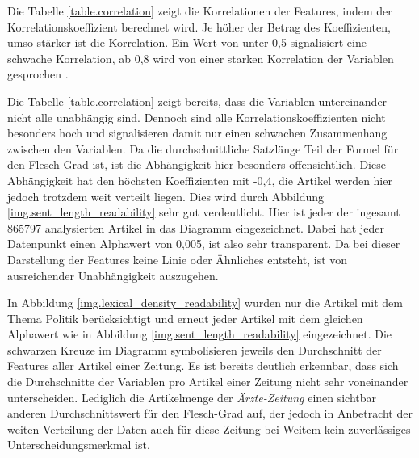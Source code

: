 Die Tabelle \ref{table.correlation} zeigt die Korrelationen der Features, indem der Korrelationskoeffizient berechnet wird. Je höher der Betrag des Koeffizienten, umso stärker ist die Korrelation. Ein Wert von unter 0,5 signalisiert eine schwache Korrelation, ab 0,8 wird von einer starken Korrelation der Variablen gesprochen \cite[S.~268-273]{burkschat2012beschreibende}.

Die Tabelle \ref{table.correlation} zeigt bereits, dass die Variablen untereinander nicht alle unabhängig sind. Dennoch sind alle Korrelationskoeffizienten nicht besonders hoch und signalisieren damit nur einen schwachen Zusammenhang zwischen den Variablen. Da die durchschnittliche Satzlänge Teil der Formel für den Flesch-Grad ist, ist die Abhängigkeit hier besonders offensichtlich. Diese Abhängigkeit hat den höchsten Koeffizienten mit -0,4, die Artikel werden hier jedoch trotzdem weit verteilt liegen. Dies wird durch Abbildung \ref{img.sent_length_readability} sehr gut verdeutlicht. Hier ist jeder der ingesamt 865797 analysierten Artikel in das Diagramm eingezeichnet. Dabei hat jeder Datenpunkt einen Alphawert von 0,005, ist also sehr transparent. Da bei dieser Darstellung der Features keine Linie oder Ähnliches entsteht, ist von ausreichender Unabhängigkeit auszugehen.



In Abbildung \ref{img.lexical_density_readability} wurden nur die Artikel mit dem Thema Politik berücksichtigt und erneut jeder Artikel mit dem gleichen Alphawert wie in Abbildung \ref{img.sent_length_readability} eingezeichnet. Die schwarzen Kreuze im Diagramm symbolisieren jeweils den Durchschnitt der Features aller Artikel einer Zeitung. Es ist bereits deutlich erkennbar, dass sich die Durchschnitte der Variablen pro Artikel einer Zeitung nicht sehr voneinander unterscheiden. Lediglich die Artikelmenge der \emph{Ärzte-Zeitung} einen sichtbar anderen Durchschnittswert für den Flesch-Grad auf, der jedoch in Anbetracht der weiten Verteilung der Daten auch für diese Zeitung bei Weitem kein zuverlässiges Unterscheidungsmerkmal ist.

